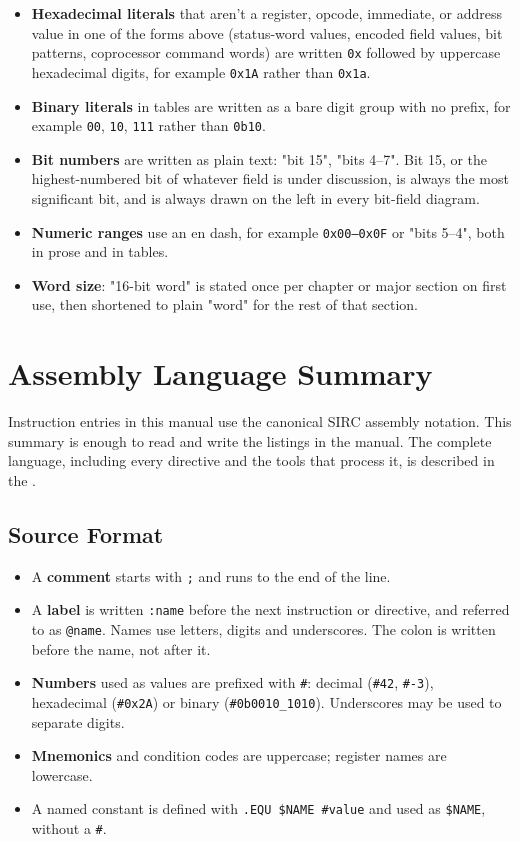 \begin{itemize}
	\item \textbf{Hexadecimal literals} that aren't a register, opcode, immediate, or address value in one of the forms above
	      (status-word values, encoded field values, bit patterns, coprocessor command words) are written
	      \texttt{0x} followed by uppercase hexadecimal digits, for example \texttt{0x1A} rather than \texttt{0x1a}.
	\item \textbf{Binary literals} in tables are written as a bare digit group with no prefix, for example
	      \texttt{00}, \texttt{10}, \texttt{111} rather than \texttt{0b10}.
	\item \textbf{Bit numbers} are written as plain text: "bit 15", "bits 4--7". Bit 15, or the
	      highest-numbered bit of whatever field is under discussion, is always the most significant bit, and is
	      always drawn on the left in every bit-field diagram.
	\item \textbf{Numeric ranges} use an en dash, for example \texttt{0x00--0x0F} or "bits 5--4", both in
	      prose and in tables.
	\item \textbf{Word size}: "16-bit word" is stated once per chapter or major section on first use, then
	      shortened to plain "word" for the rest of that section.
\end{itemize}

\section*{Assembly Language Summary}

Instruction entries in this manual use the canonical SIRC assembly notation. This summary is enough to read and write
the listings in the manual. The complete language, including every directive and the tools that process it, is
described in the \asmmanual{}.

\subsection*{Source Format}

\begin{itemize}
	\item A \textbf{comment} starts with \texttt{;} and runs to the end of the line.
	\item A \textbf{label} is written \texttt{:name} before the next instruction or directive, and referred to as \texttt{@name}.
	      Names use letters, digits and underscores. The colon is written before the name, not after it.
	\item \textbf{Numbers} used as values are prefixed with \texttt{\#}: decimal (\texttt{\#42}, \texttt{\#-3}),
	      hexadecimal (\texttt{\#0x2A}) or binary (\texttt{\#0b0010\_1010}). Underscores may be used to separate digits.
	\item \textbf{Mnemonics} and condition codes are uppercase; register names are lowercase.
	\item A named constant is defined with \texttt{.EQU \$NAME \#value} and used as \texttt{\$NAME}, without a \texttt{\#}.
\end{itemize}


